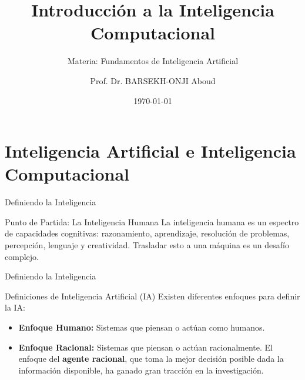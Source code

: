 \documentclass[aspectratio=169,xcolor=dvipsnames]{beamer}
\title{Introducción a la Inteligencia Computacional}
\subtitle{Materia: Fundamentos de Inteligencia Artificial}
\author{Prof. Dr. BARSEKH-ONJI Aboud}
\institute
{
    Facultad de Ingeniería \\
    Universidad Anáhuac México %
}
\date{\today} %
\begin{document}
\begin{frame}
    \titlepage
\end{frame}

\section{Inteligencia Artificial e Inteligencia Computacional}

\begin{frame}{Definiendo la Inteligencia}
    \begin{block}{Punto de Partida: La Inteligencia Humana}
    La inteligencia humana es un espectro de capacidades cognitivas: razonamiento, aprendizaje, resolución de problemas, percepción, lenguaje y creatividad. Trasladar esto a una máquina es un desafío complejo.
    \end{block}
\end{frame}
\begin{frame}{Definiendo la Inteligencia}

    \begin{alertblock}{Definiciones de Inteligencia Artificial (IA)}
    Existen diferentes enfoques para definir la IA:
        \begin{itemize}
            \item \textbf{Enfoque Humano:} Sistemas que piensan o actúan como humanos.
            \item \textbf{Enfoque Racional:} Sistemas que piensan o actúan racionalmente. El enfoque del \textbf{agente racional}, que toma la mejor decisión posible dada la información disponible, ha ganado gran tracción en la investigación.
        \end{itemize}
    \end{alertblock}
\end{frame}

\end{document}
